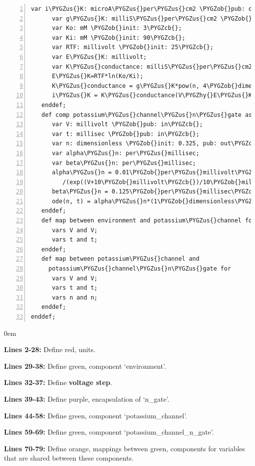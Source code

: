\documentclass[a4paper,10pt,english]{sphinxmanual}
\renewcommand{\DUspan}[2]{#1, #2}
\def\PYGZus{\char`\_}
\def\PYGZob{\char`\{}
\def\PYGZcb{\char`\}}
\def\PYGZhy{\char`\-}
\begin{document}
\begin{Verbatim}[commandchars=\\\{\},numbers=left,firstnumber=1,stepnumber=1]
      var i\PYGZus{}K: microA\PYGZus{}per\PYGZus{}cm2 \PYGZob{}pub: out\PYGZcb{};
      var g\PYGZus{}K: milliS\PYGZus{}per\PYGZus{}cm2 \PYGZob{}init: 36\PYGZcb{};
      var Ko: mM \PYGZob{}init: 3\PYGZcb{};
      var Ki: mM \PYGZob{}init: 90\PYGZcb{};
      var RTF: millivolt \PYGZob{}init: 25\PYGZcb{};
      var E\PYGZus{}K: millivolt;
      var K\PYGZus{}conductance: milliS\PYGZus{}per\PYGZus{}cm2 \PYGZob{}pub: out\PYGZcb{};
      E\PYGZus{}K=RTF*ln(Ko/Ki);
      K\PYGZus{}conductance = g\PYGZus{}K*pow(n, 4\PYGZob{}dimensionless\PYGZcb{});
      i\PYGZus{}K = K\PYGZus{}conductance(V\PYGZhy{}E\PYGZus{}K);
   enddef;
   def comp potassium\PYGZus{}channel\PYGZus{}n\PYGZus{}gate as
      var V: millivolt \PYGZob{}pub: in\PYGZcb{};
      var t: millisec \PYGZob{}pub: in\PYGZcb{};
      var n: dimensionless \PYGZob{}init: 0.325, pub: out\PYGZcb{};
      var alpha\PYGZus{}n: per\PYGZus{}millisec;
      var beta\PYGZus{}n: per\PYGZus{}millisec;
      alpha\PYGZus{}n = 0.01\PYGZob{}per\PYGZus{}millivolt\PYGZus{}millisec\PYGZcb{}*(V+10\PYGZob{}millivolt\PYGZcb{})
         /(exp((V+10\PYGZob{}millivolt\PYGZcb{})/10\PYGZob{}millivolt\PYGZcb{})\PYGZhy{}1\PYGZob{}dimensionless\PYGZcb{});
      beta\PYGZus{}n = 0.125\PYGZob{}per\PYGZus{}millisec\PYGZcb{}*exp(V/80\PYGZob{}millivolt\PYGZcb{});
      ode(n, t) = alpha\PYGZus{}n*(1\PYGZob{}dimensionless\PYGZcb{}\PYGZhy{}n)\PYGZhy{}beta\PYGZus{}n*n;
   enddef;
   def map between environment and potassium\PYGZus{}channel for
      vars V and V;
      vars t and t;
   enddef;
   def map between potassium\PYGZus{}channel and
     potassium\PYGZus{}channel\PYGZus{}n\PYGZus{}gate for
      vars V and V;
      vars t and t;
      vars n and n;
   enddef;
enddef;
\end{Verbatim}

\begin{DUlineblock}{0em}
\item[] \textbf{Lines 2-28:} Define \DUspan{red}{units}.
\item[] \textbf{Lines 29-38:} Define \DUspan{green}{component} `environment'.
\item[] \textbf{Lines 32-37:} Define \textbf{voltage step}.
\item[] \textbf{Lines 39-43:} Define \DUspan{purple}{encapsulation} of `n\_gate'.
\item[] \textbf{Lines 44-58:} Define \DUspan{green}{component} `potassium\_channel'.
\item[] \textbf{Lines 59-69:} Define \DUspan{green}{component} `potassium\_channel\_n\_gate'.
\item[] \textbf{Lines 70-79:} Define \DUspan{orange}{mappings} between \DUspan{green}{components} for variables that are shared between these components.
\end{DUlineblock}
\end{document}
